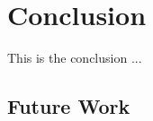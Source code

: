 \chapter{Conclusion}

\label{Chapter9_conclusion} 

\begin{comment}
-------------------------------------------------
9. Conclusion
	a. Future Work
		i. Scoring Functions Improvement
		ii. Other Improvements (UI, distribution, change of framework. electron ui -> web based. )
	b. Personal Note
-------------------------------------------------
\end{comment}

This is the conclusion ...

\section{Future Work}
\begin{comment}

	-angle, dont die if left/right. 
	-need to have a way of returning 0 if one of the fingers is compeletley off. 
	-need to be able to parameterize by finger level. (compare2). if in gesture10 we expect the pinky to be a little curved, should be able to set that parameter on that pinky in that gesture. rather than entire algorithm. need more fine tune parameterization. 
	
	
	
show the 2 figures about loading/creating user. explain why you needed ot make users. meeting with clinicians. working product demonstration. agile. as opposed ot waterfall (this should go in conclusion). 
- in the same thread, could also explain how the rotation of the hand was also the clinician's idea. 
\end{comment}


